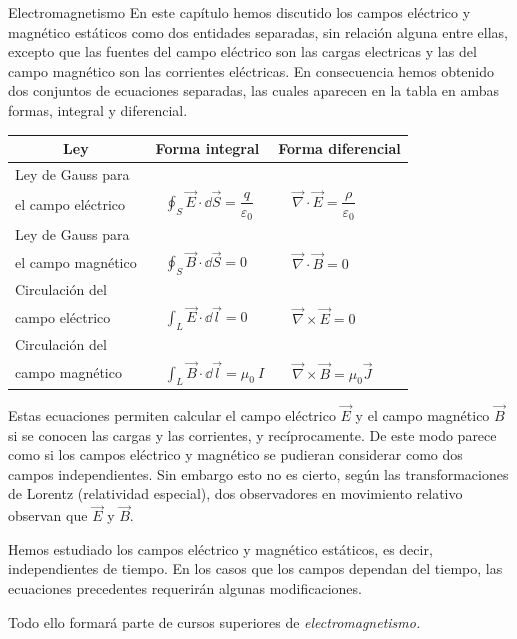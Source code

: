 \newpage %
\begin{myblock}{Electromagnetismo}
En este capítulo hemos discutido los campos eléctrico y magnético estáticos como dos entidades separadas, sin relación alguna entre ellas, excepto que las fuentes del campo eléctrico son las cargas electricas y las del campo magnético son las corrientes eléctricas. En consecuencia hemos obtenido dos conjuntos de ecuaciones separadas, las cuales aparecen en la tabla en ambas formas, integral y diferencial. 

\begin{table}[H]
\centering
\begin{tabular}{l|l|l}
\multicolumn{1}{c|}{\textbf{Ley}}        & \multicolumn{1}{c|}{\textbf{Forma integral}}                                     & \multicolumn{1}{c}{\textbf{Forma diferencial}}                                       \\ \hline
Ley de Gauss para \\ el campo eléctrico  & $\quad \displaystyle \oint_S \vec E \cdot \dd \vec S = \dfrac{q}{\varepsilon_0}$  & $\quad \overrightarrow{\nabla}\cdot \overrightarrow{E}=\dfrac {\rho}{\varepsilon_0}$ \\
Ley de Gauss para \\  el campo magnético  & $\quad \displaystyle \oint_S \vec B \cdot \dd \vec S = 0$                        & $\quad \overrightarrow{\nabla}\cdot \overrightarrow{B}=0$                            \\
Circulación del \\ campo eléctrico        & $\quad \displaystyle \int_L \vec E \cdot \dd \vec l = 0$                         & $\quad \overrightarrow{\nabla}\times \overrightarrow{E}=0$                           \\
Circulación del \\ campo magnético        & $\quad \displaystyle \int_L \vec B \cdot \dd \vec l = \mu_0\ I$                  & $\quad \overrightarrow{\nabla}\times \overrightarrow{B}=\mu_0 \vec J$               
\end{tabular}
\end{table}

Estas ecuaciones permiten calcular el campo eléctrico $\vec E$ y el campo magnético $\vec B$ si se conocen las cargas y las corrientes, y recíprocamente. De este modo parece como si los campos eléctrico y magnético se pudieran considerar como dos campos independientes. Sin embargo esto no es cierto, según las transformaciones de Lorentz (relatividad especial), dos observadores en movimiento relativo observan que $\vec E$ y $\vec B$.



Hemos estudiado los campos eléctrico y magnético estáticos, es decir, independientes de tiempo. En los casos que los campos dependan del tiempo, las ecuaciones precedentes requerirán algunas modificaciones. 

Todo ello formará parte de cursos superiores de \emph{electromagnetismo.}
	
\end{myblock}
